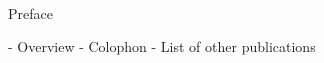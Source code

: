 \pagestyle{plain} \setcounter{page}{2}
\renewcommand{\baselinestretch}{2}
\small\normalsize
\hbox{\ }

\vspace{-.65in}

\begin{center}
\large{Preface}
\end{center}


- Overview
- Colophon
- List of other publications
